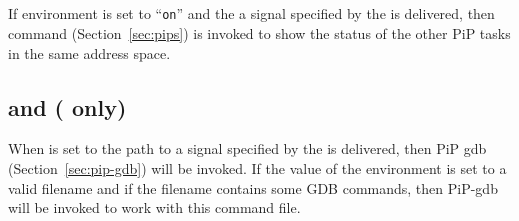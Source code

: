 \subsection{}

If  environment is set to ``{\tt on}'' and the
a signal specified by the  is delivered, then
 command (Section~\ref{sec:pips}) is invoked to show the
status of the other PiP tasks in the same address space.

\subsection{ and  ( only)}

When  is set to the path to 
a signal specified by the  is delivered, then
PiP gdb (Section~\ref{sec:pip-gdb}) will be invoked. If the value of
the  environment is set to a valid filename
and if the filename contains some GDB commands, then PiP-gdb will be
invoked to work with this command file. 
